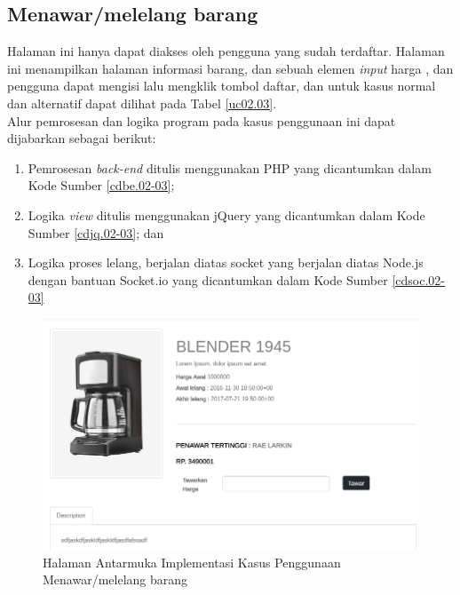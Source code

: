 \subsection{Menawar/melelang barang}
Halaman ini hanya dapat diakses oleh pengguna yang sudah terdaftar. Halaman ini menampilkan halaman informasi barang, dan sebuah elemen \textit{input} harga , dan pengguna dapat mengisi lalu mengklik tombol daftar, dan untuk kasus normal dan alternatif dapat dilihat pada Tabel \ref{uc02.03}.\\
\indent Alur pemrosesan dan logika program pada kasus penggunaan ini dapat dijabarkan sebagai berikut:
	\begin{enumerate}
		\item Pemrosesan \textit{back-end} ditulis menggunakan PHP yang dicantumkan dalam Kode Sumber \ref{cdbe.02-03}; 
		\item Logika \textit{view} ditulis menggunakan jQuery yang dicantumkan dalam Kode Sumber \ref{cdjq.02-03}; dan
		\item Logika proses lelang, berjalan diatas socket yang berjalan diatas Node.js dengan bantuan Socket.io yang dicantumkan dalam Kode Sumber \ref{cdsoc.02-03}
	\end{enumerate}

\begin{figure}[H]
    \centering
    \includegraphics[width=\textwidth]{images/bab4/ui/02-03.png}
    \caption{Halaman Antarmuka  Implementasi Kasus Penggunaan Menawar/melelang barang}
    \label{ui.02-03}
\end{figure}


